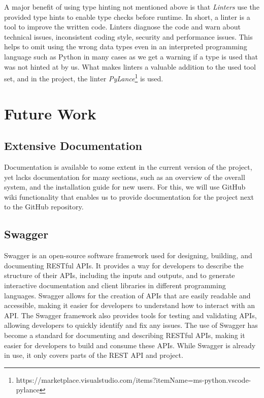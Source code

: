 \documentclass{article}
\begin{document}
        A major benefit of using type hinting not mentioned above is that \emph{Linters} use the provided type hints to enable type checks before runtime. 
        In short, a linter is a tool to improve the written code. Linters diagnose the code and warn about technical issues, inconsistent coding style, security and performance issues. This helps to omit using the wrong data types even in an interpreted programming language such as Python in many cases as we get a warning if a type is used that was not hinted at by us.
        What makes linters a valuable addition to the used tool set, and in the project, the linter \emph{PyLance}\footnote{https://marketplace.visualstudio.com/items?itemName=ms-python.vscode-pylance} is used. 

        
    \section{Future Work}
        \subsection{Extensive Documentation}
            Documentation is available to some extent in the current version of the project, yet lacks documentation for many sections, such as an overview of the overall system, and the installation guide for new users.
            For this, we will use GitHub wiki functionality that enables us to provide documentation for the project next to the GitHub repository.
            
        \subsection{Swagger}
            Swagger is an open-source software framework used for designing, building, and documenting RESTful APIs. It provides a way for developers to describe the structure of their APIs, including the inputs and outputs, and to generate interactive documentation and client libraries in different programming languages. Swagger allows for the creation of APIs that are easily readable and accessible, making it easier for developers to understand how to interact with an API. The Swagger framework also provides tools for testing and validating APIs, allowing developers to quickly identify and fix any issues. The use of Swagger has become a standard for documenting and describing RESTful APIs, making it easier for developers to build and consume these APIs.
            While Swagger is already in use, it only covers parts of the REST API and project.
\end{document}
